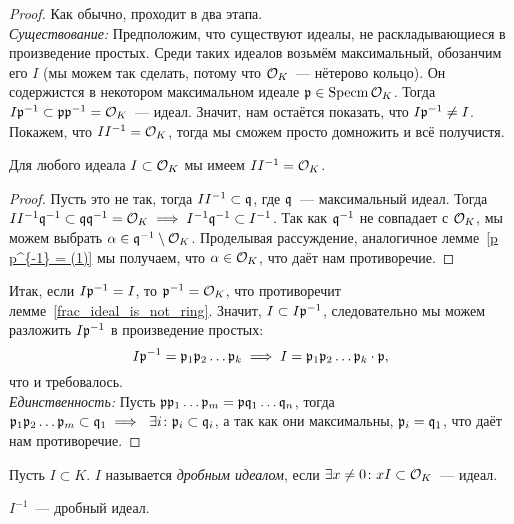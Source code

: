 	\begin{proof} Как обычно, проходит в два этапа. \\
		\emph{Существование:} Предположим, что существуют идеалы, не раскладывающиеся в произведение простых. Среди таких идеалов возьмём максимальный, обозанчим его $I$ (мы можем так сделать, потому что $\mathcal{O}_{K}$~--- нётерово кольцо). Он содержистся в некотором максимальном идеале $\mathfrak{p} \in \operatorname{Specm}{\mathcal{O}_{K}}$. Тогда $I \mathfrak{p}^{-1} \subset \mathfrak{p} \mathfrak{p}^{-1} = \mathcal{O}_{K}$~--- идеал. Значит, нам остаётся показать, что $I \mathfrak{p}^{-1} \neq I$. Покажем, что $I I^{-1} = \mathcal{O}_{K}$, тогда мы сможем просто домножить и всё получистя. 

		\begin{lemma} 
			Для любого идеала $I \subset \mathcal{O}_{K}$ мы имеем $I I^{-1} = \mathcal{O}_{K}$. 
		\end{lemma}

		\begin{proof}
			Пусть это не так, тогда $I I^{-1} \subset \mathfrak{q}$, где $\mathfrak{q}$~--- максимальный идеал. Тогда $I I^{-1} \mathfrak{q}^{-1} \subset \mathfrak{q} \mathfrak{q}^{-1} = \mathcal{O}_{K} \implies  I^{-1}\mathfrak{q}^{-1} \subset I^{-1}$. Так как $\mathfrak{q}^{-1}$ не совпадает с $\mathcal{O}_{K}$, мы можем выбрать $\alpha \in \mathfrak{q}^{-1}\setminus \mathcal{O}_{K}$. Проделывая рассуждение, аналогичное лемме~\ref{p p^{-1} = (1)} мы получаем, что $\alpha \in \mathcal{O}_{K}$, что даёт нам противоречие. 
		\end{proof}

		Итак, если $I \mathfrak{p}^{-1} = I$, то $\mathfrak{p}^{-1} = \mathcal{O}_{K}$, что противоречит лемме~\ref{frac_ideal_is_not_ring}. Значит, $I \subset I\mathfrak{p}^{-1} $, следовательно мы можем разложить $I \mathfrak{p}^{-1}$ в произведение простых:
		\[
			I \mathfrak{p}^{-1} = \mathfrak{p}_{1} \mathfrak{p}_{2} \ldots \mathfrak{p}_{k} \implies I = \mathfrak{p}_{1} \mathfrak{p}_{2} \ldots \mathfrak{p}_{k} \cdot \mathfrak{p}, 
		\]
		что и требовалось. \\
		\emph{Единственность:} Пусть $\mathfrak{p} \mathfrak{p}_{1} \ldots \mathfrak{p}_{m} = \mathfrak{p} \mathfrak{q}_{1} \ldots \mathfrak{q}_{n}$, тогда $\mathfrak{p}_{1} \mathfrak{p}_{2} \ldots \mathfrak{p}_{m} \subset \mathfrak{q}_{1} \implies \ \exists i\colon \mathfrak{p}_{i} \subset \mathfrak{q}_{i}$, а так как они максимальны, $\mathfrak{p}_{i} = \mathfrak{q}_{1}$, что даёт нам противоречие. 
	\end{proof}

	\begin{definition} 
		Пусть $I \subset K$. $I$ называется \emph{дробным идеалом}, если $\exists x \neq 0\colon x I \subset \mathcal{O}_{K}$~--- идеал.
	\end{definition}

	\begin{example}
		$I^{-1}$~--- дробный идеал. 
	\end{example}


